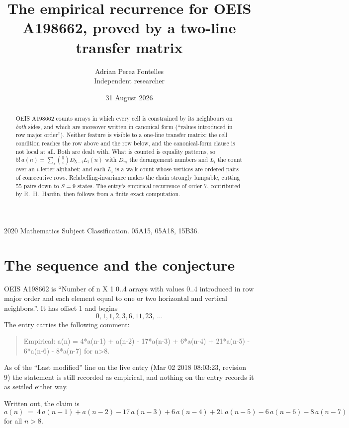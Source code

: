 \documentclass[11pt,a4paper]{article}
\title{The empirical recurrence for OEIS A198662, proved by a two-line transfer matrix}
\author{Adrian Perez Fontelles\\ \small Independent researcher}
\date{31 August 2026}
\theoremstyle{plain}
\theoremstyle{definition}
\begin{document}
\maketitle

\begin{abstract}
OEIS A198662 counts arrays in which every cell is constrained by its neighbours on \emph{both}
sides, and which are moreover written in canonical form (``values introduced in row major
order''). Neither feature is visible to a one-line transfer matrix: the cell condition
reaches the row above and the row below, and the canonical-form clause is not local at
all. Both are dealt with. What is counted is equality patterns, so
$5!\,a(n)=\sum_i\binom{5}{i}D_{5-i}L_i(n)$ with $D_m$ the derangement numbers and
$L_i$ the count over an $i$-letter alphabet; and each $L_i$ is a walk count whose vertices
are ordered pairs of consecutive rows. Relabelling-invariance makes the chain strongly
lumpable, cutting $55$ pairs down to $S=9$ states. The entry's empirical recurrence of
order $7$, contributed by R.~H.~Hardin, then follows from a finite exact computation.
\end{abstract}

\noindent\small 2020 Mathematics Subject Classification. 05A15, 05A18, 15B36.\normalsize

\section{The sequence and the conjecture}

OEIS A198662 is ``Number of n X 1 0..4 arrays with values 0..4 introduced in row major order and each element equal to one or two horizontal and vertical neighbors.''. It has offset $1$ and begins
\[
0, 1, 1, 2, 3, 6, 11, 23,\ \dots
\]
The entry carries the following comment:
\begin{quote}\small
Empirical: a(n) = 4*a(n-1) + a(n-2) - 17*a(n-3) + 6*a(n-4) + 21*a(n-5) - 6*a(n-6) - 8*a(n-7) for n>8.
\end{quote}
As of the ``Last modified'' line on the live entry (Mar 02 2018 08:03:23, revision 9) the statement is
still recorded as empirical, and nothing on the entry records it as settled either way.

Written out, the claim is
\begin{equation}\label{eq:conj}
a(n)\;=\;4\,a(n-1) + a(n-2) - 17\,a(n-3) + 6\,a(n-4) + 21\,a(n-5) - 6\,a(n-6) - 8\,a(n-7)
\end{equation}
for all $n>8$.
\end{document}
